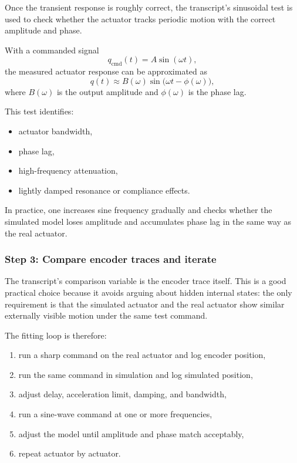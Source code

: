 \documentclass[11pt,a4paper]{article}
\begin{document}
Once the transient response is roughly correct, the transcript's sinusoidal
test is used to check whether the actuator tracks periodic motion with the
correct amplitude and phase.

With a commanded signal
\begin{equation}
      q_{\mathrm{cmd}}(t) = A\sin(\omega t),
      \label{eq:sine_command}
\end{equation}
the measured actuator response can be approximated as
\begin{equation}
      q(t) \approx B(\omega)\sin\!\bigl(\omega t - \phi(\omega)\bigr),
      \label{eq:sine_response}
\end{equation}
where $B(\omega)$ is the output amplitude and $\phi(\omega)$ is the phase lag.

This test identifies:
\begin{itemize}[leftmargin=2em]
      \item actuator bandwidth,
      \item phase lag,
      \item high-frequency attenuation,
      \item lightly damped resonance or compliance effects.
\end{itemize}

In practice, one increases sine frequency gradually and checks whether the
simulated model loses amplitude and accumulates phase lag in the same way as
the real actuator.

\subsubsection{Step 3: Compare encoder traces and iterate}

The transcript's comparison variable is the encoder trace itself.  This is a
good practical choice because it avoids arguing about hidden internal states:
the only requirement is that the simulated actuator and the real actuator show
similar externally visible motion under the same test command.

The fitting loop is therefore:
\begin{enumerate}[leftmargin=2em]
      \item run a sharp command on the real actuator and log encoder position,
      \item run the same command in simulation and log simulated position,
      \item adjust delay, acceleration limit, damping, and bandwidth,
      \item run a sine-wave command at one or more frequencies,
      \item adjust the model until amplitude and phase match acceptably,
      \item repeat actuator by actuator.
\end{enumerate}
\end{document}
